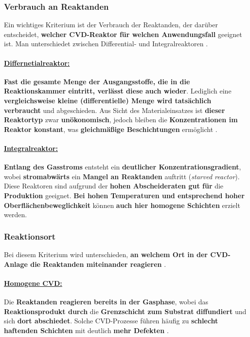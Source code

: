 \documentclass{article} %
\begin{document}
\vspace{1em}
\subsubsection{Verbrauch an Reaktanden} %
Ein wichtiges Kriterium ist der Verbrauch der Reaktanden, der darüber entscheidet, \textbf{welcher CVD-Reaktor für welchen Anwendungsfall} geeignet ist. Man 
unterschiedet zwischen Differential- und Integralreaktoren \cite{keplinger2024CVD}.

\vspace{0.0em}
\paragraph{\uline{Differnetialreaktor:}} \textbf{Fast die gesamte Menge der Ausgangsstoffe, die in die Reaktionskammer eintritt, verlässt diese auch wieder}. 
Lediglich eine \textbf{vergleichsweise kleine (differentielle) Menge wird tatsächlich verbraucht} und abgeschieden. Aus Sicht des Materialeinsatzes ist 
\textbf{dieser Reaktortyp} zwar \textbf{unökonomisch}, jedoch bleiben die \textbf{Konzentrationen im Reaktor konstant}, was \textbf{gleichmäßige Beschichtungen} 
ermöglicht \cite{keplinger2024CVD}.

\vspace{0.0em}
\paragraph{\uline{Integralreaktor:}} \textbf{Entlang des Gasstroms} entsteht ein \textbf{deutlicher Konzentrationsgradient}, wobei \textbf{stromabwärts} ein 
\textbf{Mangel an Reaktanden} auftritt (\textit{starved reactor}). Diese Reaktoren sind aufgrund der \textbf{hohen Abscheideraten gut für} die \textbf{Produktion} 
geeignet. \textbf{Bei hohen Temperaturen und entsprechend hoher Oberflächenbeweglichkeit} können \textbf{auch hier homogene Schichten} erzielt werden.

\vspace{1em}
\subsubsection{Reaktionsort} %
Bei diesem Kriterium wird unterschieden, \textbf{an welchem Ort in der CVD-Anlage die Reaktanden miteinander reagieren} \cite{keplinger2024CVD}.

\vspace{0.0em}
\paragraph{\uline{Homogene CVD:}} Die \textbf{Reaktanden reagieren bereits in der Gasphase}, wobei das \textbf{Reaktionsprodukt durch} die 
\textbf{Grenzschicht zum Substrat diffundiert} und sich \textbf{dort abschiedet}. Solche CVD-Prozesse führen häufig zu \textbf{schlecht haftenden Schichten} mit 
deutlich \textbf{mehr Defekten} \cite{keplinger2024CVD}.
\end{document}
